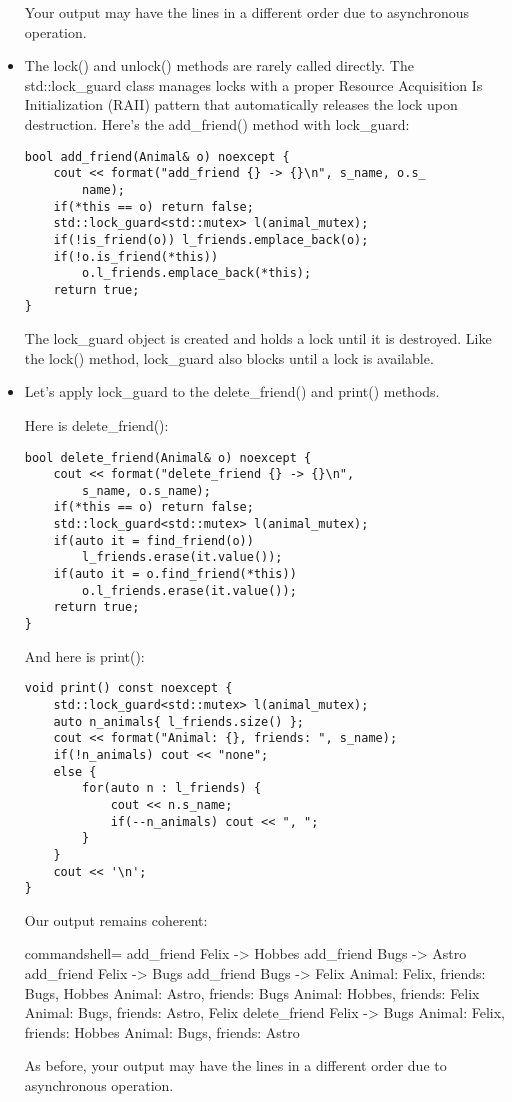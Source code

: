 \begin{itemize}
Your output may have the lines in a different order due to asynchronous operation.

\item 
The lock() and unlock() methods are rarely called directly. The std::lock\_guard class manages locks with a proper Resource Acquisition Is Initialization (RAII) pattern that automatically releases the lock upon destruction. Here's the add\_friend() method with lock\_guard:

\begin{lstlisting}[style=styleCXX]
bool add_friend(Animal& o) noexcept {
	cout << format("add_friend {} -> {}\n", s_name, o.s_
		name);
	if(*this == o) return false;
	std::lock_guard<std::mutex> l(animal_mutex);
	if(!is_friend(o)) l_friends.emplace_back(o);
	if(!o.is_friend(*this))
		o.l_friends.emplace_back(*this);
	return true;
}
\end{lstlisting}

The lock\_guard object is created and holds a lock until it is destroyed. Like the lock() method, lock\_guard also blocks until a lock is available.

\item 


Let's apply lock\_guard to the delete\_friend() and print() methods.

Here is delete\_friend():

\begin{lstlisting}[style=styleCXX]
bool delete_friend(Animal& o) noexcept {
	cout << format("delete_friend {} -> {}\n",
		s_name, o.s_name);
	if(*this == o) return false;
	std::lock_guard<std::mutex> l(animal_mutex);
	if(auto it = find_friend(o))
		l_friends.erase(it.value());
	if(auto it = o.find_friend(*this))
		o.l_friends.erase(it.value());
	return true;
}
\end{lstlisting}

And here is print():

\begin{lstlisting}[style=styleCXX]
void print() const noexcept {
	std::lock_guard<std::mutex> l(animal_mutex);
	auto n_animals{ l_friends.size() };
	cout << format("Animal: {}, friends: ", s_name);
	if(!n_animals) cout << "none";
	else {
		for(auto n : l_friends) {
			cout << n.s_name;
			if(--n_animals) cout << ", ";
		}
	}
	cout << '\n';
}
\end{lstlisting}

Our output remains coherent:

\begin{tcblisting}{commandshell={}}
add_friend Felix -> Hobbes
add_friend Bugs -> Astro
add_friend Felix -> Bugs
add_friend Bugs -> Felix
Animal: Felix, friends: Bugs, Hobbes
Animal: Astro, friends: Bugs
Animal: Hobbes, friends: Felix
Animal: Bugs, friends: Astro, Felix
delete_friend Felix -> Bugs
Animal: Felix, friends: Hobbes
Animal: Bugs, friends: Astro
\end{tcblisting}

As before, your output may have the lines in a different order due to asynchronous operation.

\end{itemize}

